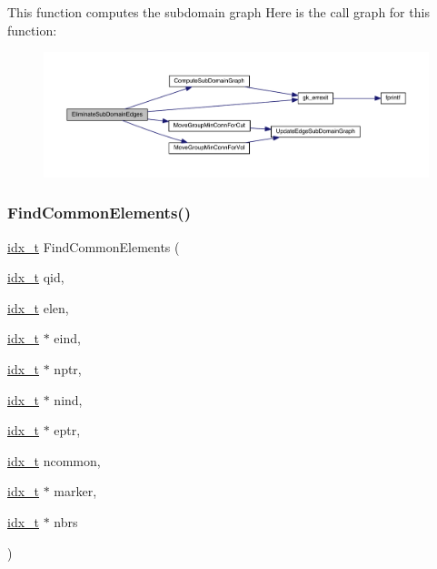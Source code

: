This function computes the subdomain graph Here is the call graph for this function\+:\nopagebreak
\begin{figure}[H]
\begin{center}
\leavevmode
\includegraphics[width=350pt]{a00945_a6dab60a85abb88ada807831e84cb84fc_cgraph}
\end{center}
\end{figure}
\mbox{\label{a00945_ab05bd1b0bb5bdaaf2e9dc8906675145c}} 
\subsubsection{\texorpdfstring{Find\+Common\+Elements()}{FindCommonElements()}}
{\footnotesize\ttfamily \hyperlink{a00876_aaa5262be3e700770163401acb0150f52}{idx\+\_\+t} Find\+Common\+Elements (\begin{DoxyParamCaption}\item[{\hyperlink{a00876_aaa5262be3e700770163401acb0150f52}{idx\+\_\+t}}]{qid,  }\item[{\hyperlink{a00876_aaa5262be3e700770163401acb0150f52}{idx\+\_\+t}}]{elen,  }\item[{\hyperlink{a00876_aaa5262be3e700770163401acb0150f52}{idx\+\_\+t} $\ast$}]{eind,  }\item[{\hyperlink{a00876_aaa5262be3e700770163401acb0150f52}{idx\+\_\+t} $\ast$}]{nptr,  }\item[{\hyperlink{a00876_aaa5262be3e700770163401acb0150f52}{idx\+\_\+t} $\ast$}]{nind,  }\item[{\hyperlink{a00876_aaa5262be3e700770163401acb0150f52}{idx\+\_\+t} $\ast$}]{eptr,  }\item[{\hyperlink{a00876_aaa5262be3e700770163401acb0150f52}{idx\+\_\+t}}]{ncommon,  }\item[{\hyperlink{a00876_aaa5262be3e700770163401acb0150f52}{idx\+\_\+t} $\ast$}]{marker,  }\item[{\hyperlink{a00876_aaa5262be3e700770163401acb0150f52}{idx\+\_\+t} $\ast$}]{nbrs }\end{DoxyParamCaption})}

